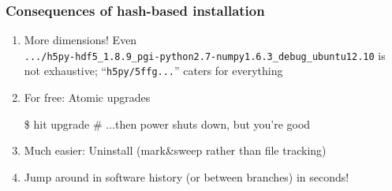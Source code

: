 \documentclass[sans,mathserif]{beamer}
\begin{document}
\begin{frame}[fragile]
  \frametitle{Consequences of hash-based installation}
  \begin{enumerate}
  \item<+-> More dimensions! Even \\
{\footnotesize
{\tt .../h5py-hdf5\_1.8.9\_pgi-python2.7-numpy1.6.3\_debug\_ubuntu12.10}
}
is not exhaustive; ``{\tt h5py/5ffg...}'' caters for everything

  \item<+-> For free: Atomic upgrades
\begin{semiverbatim}
\$ hit upgrade
# ...then power shuts down, but you're good
\end{semiverbatim}

  \item<+-> Much easier: Uninstall (mark\&sweep rather than file tracking)

  \item<+-> Jump around in software history (or between branches) in seconds!


  \end{enumerate}

~

\end{frame}
\end{document}
